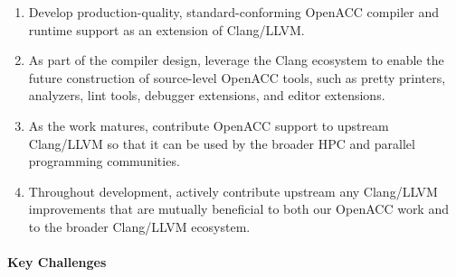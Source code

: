 \begin{enumerate}

\item Develop production-quality, standard-conforming OpenACC compiler
and runtime support as an extension of Clang/LLVM.

\item As part of the compiler design, leverage the Clang ecosystem to enable
the future construction of source-level OpenACC tools, such as pretty
printers, analyzers, lint tools, debugger extensions, and editor extensions.

\item As the work matures, contribute OpenACC support to upstream Clang/LLVM
so that it can be used by the broader HPC and parallel programming
communities.

\item Throughout development, actively contribute upstream any Clang/LLVM
improvements that are mutually beneficial to both our OpenACC work and to
the broader Clang/LLVM ecosystem.


\end{enumerate}


\paragraph{Key Challenges}

